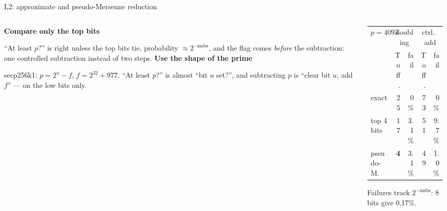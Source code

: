 \documentclass[aspectratio=169,11pt]{beamer}
\newcommand{\blocktitle}[1]{{\bfseries #1}\par\vskip1mm}
\begin{document}
\begin{frame}{L2: approximate and pseudo-Mersenne reduction}
  \begin{columns}[T]
    \begin{column}{0.5\textwidth}
      \small
      \blocktitle{Compare only the top bits}
      ``At least $p$?'' is right unless the top bits tie, probability $\approx2^{-\text{msbs}}$, and the flag comes \emph{before} the subtraction: one controlled subtraction instead of two steps.
      \vskip2mm
      \blocktitle{Use the shape of the prime}
      secp256k1: $p=2^{u}-f$, $f=2^{32}+977$. ``At least $p$?'' is almost ``bit $u$ set?'', and subtracting $p$ is ``clear bit $u$, add $f$'' --- on the low bits only.
    \end{column}
    \begin{column}{0.46\textwidth}
      \centering
      \vskip2mm
      \footnotesize
      \renewcommand{\arraystretch}{1.08}
      \begin{tabular}{@{}lrrrr@{}}
        \toprule
        $p=4093$ & \multicolumn{2}{c}{doubling} & \multicolumn{2}{c}{ctrl.\ add} \\
        & Toff. & fail & Toff. & fail \\
        \midrule
        exact & 25 & 0\% & 73 & 0\% \\
        top 4 bits & 17 & 3.1\% & 51 & 9.7\% \\
        pseudo-M. & \textbf{4} & 3.1\% & 49 & 1.0\% \\
        \bottomrule
      \end{tabular}\par
      {\scriptsize Failures track $2^{-\text{msbs}}$: 8 bits give 0.17\%.}
    \end{column}
  \end{columns}
\end{frame}
\end{document}
